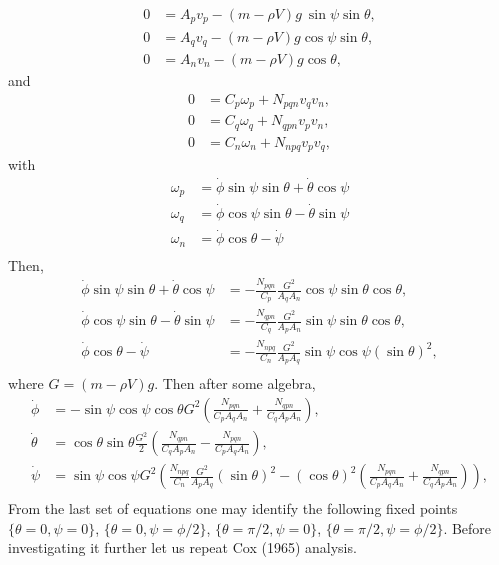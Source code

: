 \documentclass[12pt]{My_preprint}
\begin{document}
\begin{align}
    0 &= A_p v_p - (m-\rho V)g\ \sin \psi \sin \theta, \label{eq:vp}\\
    0 &= A_q v_q - (m-\rho V)g\cos \psi \sin \theta,
\label{eq:vq} \\
   0 &= A_n v_n - (m-\rho V)g\cos \theta,
\label{eq:vn}
\end{align}
and
\begin{align}
    0 &= C_p \omega_p + N_{pqn} v_q v_n, \label{eq:omp}\\
    0 &= C_q \omega_q + N_{qpn} v_p v_n, \label{eq:omq} \\
   0 &= C_n \omega_n + N_{npq} v_p v_q,\label{eq:omn}
\end{align}
with
\begin{align}
    \omega_p &= \dot \phi \sin \psi \sin \theta +  \dot \theta \cos \psi \\
    \omega_q &= \dot \phi \cos \psi \sin \theta -  \dot \theta \sin \psi \\
    \omega_n &= \dot \phi \cos \theta -  \dot \psi \\
\end{align}
Then,
\begin{align}
    \dot \phi \sin \psi \sin \theta +  \dot \theta \cos \psi &= -\frac{N_{pqn}}{C_p} \frac{G^2}{A_q A_n}\cos \psi \sin \theta\cos \theta, \\
    \dot \phi \cos \psi \sin \theta -  \dot \theta \sin \psi &= -\frac{N_{qpn}}{C_q} \frac{G^2}{A_p A_n}\sin \psi \sin \theta\cos \theta, \\
    \dot \phi \cos \theta -  \dot \psi &= -\frac{N_{npq}}{C_n}\frac{G^2}{A_p A_q}\sin \psi \cos \psi (\sin \theta) ^2,\\
\end{align}
where $G = (m-\rho V)g$.
Then after some algebra,
\begin{align}
    \dot \phi  &= -\sin \psi \cos \psi  \cos \theta G^2 \left(\frac{N_{pqn}}{C_pA_q A_n}+\frac{N_{qpn}}{C_qA_p A_n}\right), \\
    \dot \theta  &= \cos \theta \sin \theta\frac{G^2}{2} \left(\frac{N_{qpn}}{C_qA_p A_n} - \frac{N_{pqn}}{C_pA_q A_n}\right), \\
    \dot \psi   &= \sin \psi \cos \psi G^2 \left(\frac{N_{npq}}{C_n}\frac{G^2}{A_p A_q}(\sin \theta) ^2-(\cos \theta)^2\left(\frac{N_{pqn}}{C_pA_q A_n}+\frac{N_{qpn}}{C_qA_p A_n}\right)\right),\\
\end{align}
From the last set of equations one may identify the following fixed points $\{\theta =0,  \psi = 0\}$, $\{\theta =0,  \psi = \phi/2\}$, $\{\theta =\pi/2,  \psi = 0\}$, $\{\theta =\pi/2,  \psi = \phi/2\}$.
Before investigating it further let us repeat Cox (1965) analysis.
\end{document}
